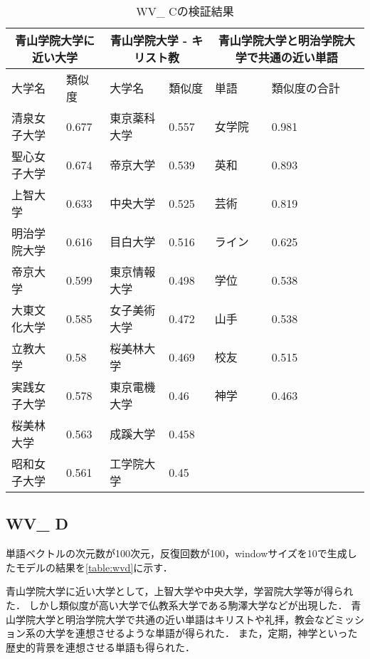 \begin{table}[H]
\caption{WV\_ Cの検証結果}
\centering
\footnotesize
\begin{tabular}{ll|ll|ll}
\hline
\multicolumn{2}{c}{青山学院大学に近い大学} & \multicolumn{2}{c}{青山学院大学 - キリスト教} & \multicolumn{2}{c}{青山学院大学と明治学院大学で共通の近い単語}
\\ \hline
大学名 & 類似度 & 大学名 & 類似度 & 単語 & 類似度の合計
\\ \hline \hline
清泉女子大学 & 0.677 & 東京薬科大学 & 0.557 & 女学院 & 0.981\\
聖心女子大学 & 0.674 & 帝京大学 & 0.539 & 英和 & 0.893\\
上智大学 & 0.633 & 中央大学 & 0.525 & 芸術 & 0.819\\
明治学院大学 & 0.616 & 目白大学 & 0.516 & ライン & 0.625\\
帝京大学 & 0.599 & 東京情報大学 & 0.498 & 学位 & 0.538\\
大東文化大学 & 0.585 & 女子美術大学 & 0.472 & 山手 & 0.538\\
立教大学 & 0.58 & 桜美林大学 & 0.469 & 校友 & 0.515\\
実践女子大学 & 0.578 & 東京電機大学 & 0.46 & 神学 & 0.463\\
桜美林大学 & 0.563 & 成蹊大学 & 0.458 & & \\
昭和女子大学 & 0.561 & 工学院大学 & 0.45 & & \\ \hline
\end{tabular}
\label{table:wvc}
\end{table}


\subsection{WV\_ D}
単語ベクトルの次元数が100次元，反復回数が100，windowサイズを10で生成したモデルの結果を\ref{table:wvd}に示す．

青山学院大学に近い大学として，上智大学や中央大学，学習院大学等が得られた．
しかし類似度が高い大学で仏教系大学である駒澤大学などが出現した．
青山学院大学と明治学院大学で共通の近い単語はキリストや礼拝，教会などミッション系の大学を連想させるような単語が得られた．
また，定期，神学といった歴史的背景を連想させる単語も得られた．



